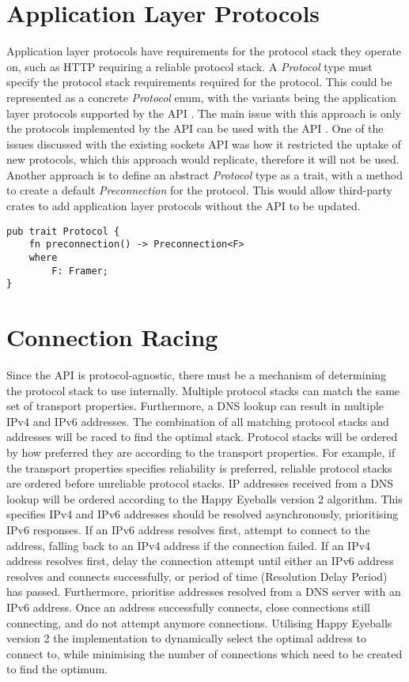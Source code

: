 \section{Application Layer Protocols}\label{sec:application-layer-protocols}
Application layer protocols have requirements for the protocol stack they operate on, such as HTTP requiring a reliable
protocol stack.
A \emph{Protocol} type must specify the protocol stack requirements required for the protocol.
This could be represented as a concrete \emph{Protocol} enum, with the variants being the application layer protocols
supported by the API .
The main issue with this approach is only the protocols implemented by the API can be used with the API .
One of the issues discussed with the existing sockets API was how it restricted the uptake of new protocols, which this
approach would replicate, therefore it will not be used.
Another approach is to define an abstract \emph{Protocol} type as a trait, with a method to create a default
\emph{Preconnection} for the protocol.
This would allow third-party crates to add application layer protocols without the API to be updated.

\begin{lstlisting}[float=h, label=lst:protocol, caption={The Protocol trait, add more info here}]
pub trait Protocol {
    fn preconnection() -> Preconnection<F>
    where
        F: Framer;
}
\end{lstlisting}


\section{Connection Racing}\label{sec:connection-racing}
Since the API is protocol-agnostic, there must be a mechanism of determining the protocol stack to use internally.
Multiple protocol stacks can match the same set of transport properties.
Furthermore, a DNS lookup can result in multiple IPv4 and IPv6 addresses.
The combination of all matching protocol stacks and addresses will be raced to find the optimal stack.
Protocol stacks will be ordered by how preferred they are according to the transport properties.
For example, if the transport properties specifies reliability is preferred, reliable protocol stacks are ordered before
unreliable protocol stacks.
IP addresses received from a DNS lookup will be ordered according to the Happy Eyeballs version 2 algorithm.
This specifies IPv4 and IPv6 addresses should be resolved asynchronously, prioritising IPv6 responses.
If an IPv6 address resolves first, attempt to connect to the address, falling back to an IPv4 address if the connection
failed.
If an IPv4 address resolves first, delay the connection attempt until either an IPv6 address resolves and connects
successfully, or period of time (Resolution Delay Period) has passed.
Furthermore, prioritise addresses resolved from a DNS server with an IPv6 address.
Once an address successfully connects, close connections still connecting, and do not attempt anymore connections.
Utilising Happy Eyeballs version 2 the implementation to dynamically select the optimal address to connect to, while
minimising the number of connections which need to be created to find the optimum.


